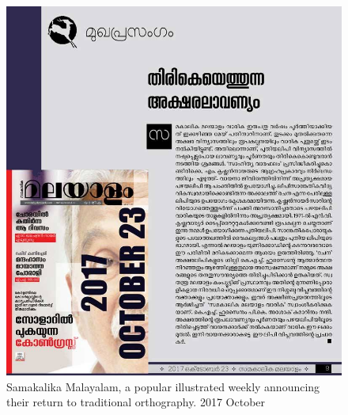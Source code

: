\documentclass[10pt]{article}
\begin{document}
\begin{figure}[H]
	\centering
	\includegraphics[scale=0.4]{images/samakalikamalayalam.jpg}
	\caption{Samakalika Malayalam, a popular illustrated weekly announcing their return to traditional orthography. 2017 October}
	\label{samakalikam}
\end{figure}
\end{document}
